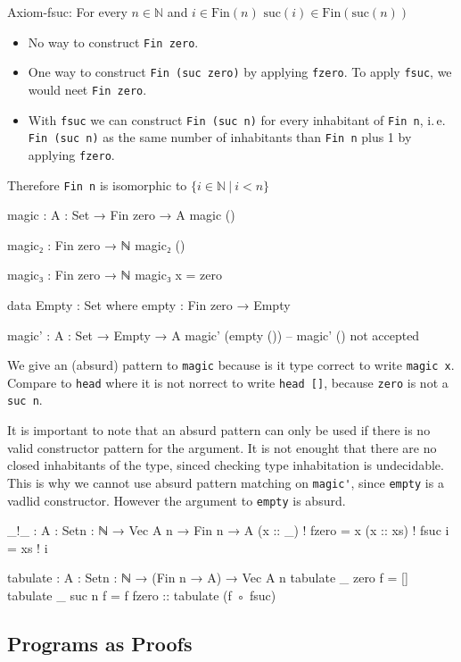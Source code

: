 Axiom-fsuc: For every $n ∈ ℕ$ and $i ∈ \text{Fin}(n)$ $\text{suc}(i) ∈ \text{Fin}(\text{suc}(n))$

\begin{itemize}
  \item No way to construct \verb+Fin zero+.
  \item One way to construct \verb+Fin (suc zero)+ by applying \verb+fzero+.
    To apply \verb+fsuc+, we would neet \verb+Fin zero+.
  \item With \verb+fsuc+ we can construct \verb+Fin (suc n)+ for every inhabitant
    of \verb+Fin n+, i. e. \verb+Fin (suc n)+ as the same number of inhabitants than
    \verb+Fin n+ plus 1 by applying \verb+fzero+.
\end{itemize}

Therefore \verb+Fin n+ is isomorphic to $\{ i ∈ ℕ ~|~ i < n \}$

\begin{code}
magic : {A : Set} → Fin zero → A
magic ()

magic₂ : Fin zero → ℕ
magic₂ ()

magic₃ : Fin zero → ℕ
magic₃ x = zero

data Empty : Set where
  empty : Fin zero → Empty

magic' : {A : Set} → Empty → A
magic' (empty ())
-- magic' () not accepted
\end{code}

We give an (absurd) pattern to \verb+magic+ because is it type correct
to write \verb+magic x+. Compare to \verb+head+ where it is not
norrect to write \verb+head []+, because \verb+zero+ is not a \verb+suc n+.

It is important to note that an absurd pattern can only be used if
there is no valid constructor pattern for the argument. It is not enought
that there are no closed inhabitants of the type, sinced checking
type inhabitation is undecidable. This is why we cannot use absurd pattern
matching on \verb+magic'+, since \verb+empty+ is a vadlid constructor. However
the argument to \verb+empty+ is absurd.

\begin{code}
_!_ : {A : Set}{n : ℕ} → Vec A n → Fin n → A
(x :: _) ! fzero = x
(x :: xs) ! fsuc i = xs ! i

tabulate : {A : Set}{n : ℕ} → (Fin n → A) → Vec A n
tabulate {_} {zero} f = []
tabulate {_} {suc n} f = f fzero :: tabulate (f ◦ fsuc)
\end{code}

\subsection{Programs as Proofs}

